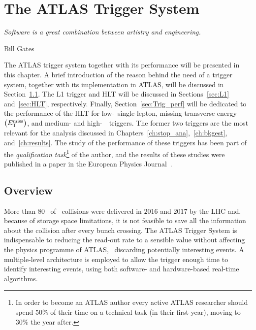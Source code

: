 \chapter{The ATLAS Trigger System}
\label{ch:trigger}
\epigraph{\emph{Software is a great combination between artistry and engineering.}}{Bill Gates}

	The \ac{ATLAS} trigger system together with its performance will be presented in this chapter. A brief introduction of the reason behind the need of a trigger system, together with its implementation in \ac{ATLAS}, will be discussed in Section~\ref{sec:Trig_intro}. The \ac{L1} trigger and \ac{HLT} will be discussed in Sections~\ref{sec:L1} and~\ref{sec:HLT}, respectively. Finally, Section~\ref{sec:Trig_perf} will be dedicated to the performance of the \ac{HLT} for low-\pt\ single-lepton, missing transverse energy $\left (E_{\mathrm{T}}^{\mathrm{miss}} \right )$, and medium- and high-\pt\ \bj\ triggers. The former two triggers are the most relevant for the analysis discussed in Chapters~\ref{ch:stop_ana},~\ref{ch:bkgest}, and~\ref{ch:results}. The study of the performance of these triggers has been part of the \textit{qualification task}\footnote{In order to become an \ac{ATLAS} author every active \ac{ATLAS} researcher should spend $50\%$ of their time on a technical task (in their first year), moving to $30\%$ the year after.} of the author, and the results of these studies were published in a paper in the European Physics Journal~\cite{ATLASTrigger2015}.


	\section{Overview}
	\label{sec:Trig_intro}

		More than 80 \ifb\ of \pp\ collisions were delivered in $2016$ and $2017$ by the \ac{LHC} and, because of storage space limitations, it is not feasible to save all the information about the collision after every bunch crossing. The \ac{ATLAS} Trigger System is indispensable to reducing the read-out rate to a sensible value without affecting the physics programme of \ac{ATLAS}, \eg\ discarding potentially interesting events. A multiple-level architecture is employed to allow the trigger enough time to identify interesting events, using both software- and hardware-based real-time algorithms. 

